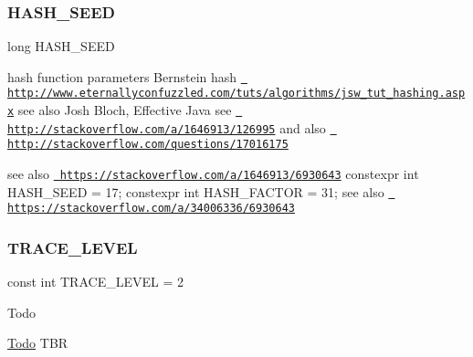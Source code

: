 \subsubsection{\texorpdfstring{HASH\_SEED}{HASH\_SEED}\hspace{0.1cm}{\footnotesize\ttfamily [2/2]}}
{\footnotesize\ttfamily long H\+A\+S\+H\+\_\+\+S\+E\+ED}



hash function parameters Bernstein hash \href{http://www.eternallyconfuzzled.com/tuts/algorithms/jsw_tut_hashing.aspx}{\texttt{ http\+://www.\+eternallyconfuzzled.\+com/tuts/algorithms/jsw\+\_\+tut\+\_\+hashing.\+aspx}} see also Josh Bloch, Effective Java see \href{http://stackoverflow.com/a/1646913/126995}{\texttt{ http\+://stackoverflow.\+com/a/1646913/126995}} and also \href{http://stackoverflow.com/questions/17016175}{\texttt{ http\+://stackoverflow.\+com/questions/17016175}} 

see also \href{https://stackoverflow.com/a/1646913/6930643}{\texttt{ https\+://stackoverflow.\+com/a/1646913/6930643}} constexpr int H\+A\+S\+H\+\_\+\+S\+E\+ED = 17; constexpr int H\+A\+S\+H\+\_\+\+F\+A\+C\+T\+OR = 31; see also \href{https://stackoverflow.com/a/34006336/6930643}{\texttt{ https\+://stackoverflow.\+com/a/34006336/6930643}} \mbox{\label{group__general_gac021c39dd4209cc19d4ec5049b3a94ec}} 
\subsubsection{\texorpdfstring{TRACE\_LEVEL}{TRACE\_LEVEL}}
{\footnotesize\ttfamily const int T\+R\+A\+C\+E\+\_\+\+L\+E\+V\+EL = 2}

\begin{DoxyRefDesc}{Todo}
\item[\mbox{\hyperlink{todo__todo000001}{Todo}}]T\+BR \end{DoxyRefDesc}
